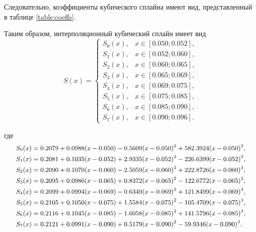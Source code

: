 Следовательно, коэффициенты кубического сплайна имеют вид, представленный в таблице \ref{table:coeffs}.

\begin{table}[H]
    \centering
    \caption{Коэффициенты кубического сплайна}
    \label{table:coeffs}
\end{table}

Таким образом, интерполяционный кубический сплайн имеет вид
\[
S(x)=
\begin{cases}
S_0(x), & x\in[0.050;0.052],\\
S_1(x), & x\in[0.052;0.060],\\
S_2(x), & x\in[0.060;0.065],\\
S_3(x), & x\in[0.065;0.069],\\
S_4(x), & x\in[0.069;0.075],\\
S_5(x), & x\in[0.075;0.085],\\
S_6(x), & x\in[0.085;0.090],\\
S_7(x), & x\in[0.090;0.096].
\end{cases}
\]

где
\[
\small\begin{aligned}
S_0(x)={}&0.2079+0.0988(x-0.050)-0.5609(x-0.050)^2+582.3924(x-0.050)^3,\\
S_1(x)={}&0.2081+0.1035(x-0.052)+2.9335(x-0.052)^2-226.6399(x-0.052)^3,\\
S_2(x)={}&0.2090+0.1070(x-0.060)-2.5059(x-0.060)^2+222.8726(x-0.060)^3,\\
S_3(x)={}&0.2095+0.0986(x-0.065)+0.8372(x-0.065)^2-122.6772(x-0.065)^3,\\
S_4(x)={}&0.2099+0.0994(x-0.069)-0.6349(x-0.069)^2+121.8499(x-0.069)^3,\\
S_5(x)={}&0.2105+0.1050(x-0.075)+1.5584(x-0.075)^2-105.4709(x-0.075)^3,\\
S_6(x)={}&0.2116+0.1045(x-0.085)-1.6058(x-0.085)^2+141.5796(x-0.085)^3,\\
S_7(x)={}&0.2121+0.0991(x-0.090)+0.5179(x-0.090)^2-59.9346(x-0.090)^3.
\end{aligned}
\]

